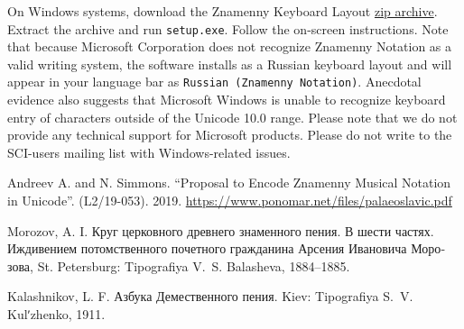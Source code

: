 \documentclass[11pt]{article}
\begin{document}
On Windows systems, download the Znamenny Keyboard Layout
\href{https://www.ponomar.net/files/cu-znams.zip}{zip archive}.
Extract the archive and run \texttt{setup.exe}. Follow the on-screen instructions.
Note that because Microsoft Corporation does not recognize Znamenny Notation
as a valid writing system, the software installs as a Russian keyboard layout
and will appear in your language bar as \texttt{Russian (Znamenny Notation)}.
Anecdotal evidence also suggests that Microsoft Windows is unable to
recognize keyboard entry of characters outside of the Unicode 10.0 range.
Please note that we do not provide any technical support for Microsoft products.
Please do not write to the SCI-users mailing list with Windows-related issues.

\begin{thebibliography}{9}

  Andreev A. and N. Simmons.
  ``Proposal to Encode Znamenny Musical Notation in Unicode''.
  (L2/19-053). 2019.
  \url{https://www.ponomar.net/files/palaeoslavic.pdf}

  Morozov, A. I. \textrussian{Круг церковного древнего знаменного пения. В шести частях. Иждивением потомственного почетного гражданина Арсения Ивановича Морозова},
  St. Petersburg: Tipografiya V.~S. Balasheva, 1884--1885.

  Kalashnikov, L. F. \textrussian{Азбука Демественного пения}. 
  Kiev: Tipografiya S.~V. Kulʹzhenko, 1911.


\end{thebibliography}
\end{document}
